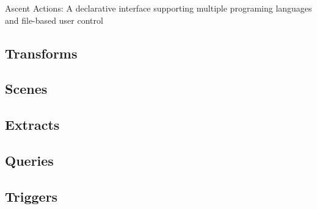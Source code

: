 Ascent Actions: A declarative interface supporting multiple programing
languages and file-based user control

\subsection{Transforms}

\subsection{Scenes}

\subsection{Extracts}

\subsection{Queries}

\subsection{Triggers}
